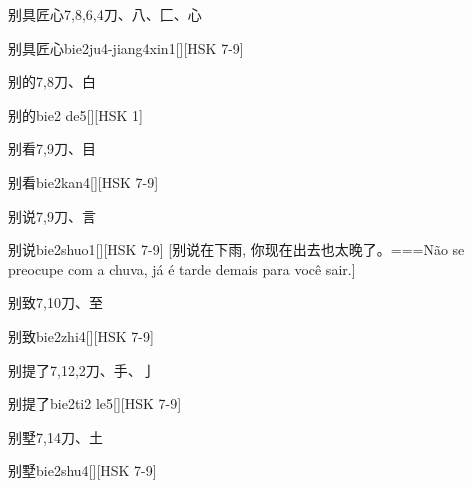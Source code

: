 \begin{Entry}{别具匠心}{7,8,6,4}{⼑、⼋、⼕、⼼}
  \begin{Phonetics}{别具匠心}{bie2ju4-jiang4xin1}[][HSK 7-9]
  \end{Phonetics}
\end{Entry}

\begin{Entry}{别的}{7,8}{⼑、⽩}
  \begin{Phonetics}{别的}{bie2 de5}[][HSK 1]
  \end{Phonetics}
\end{Entry}

\begin{Entry}{别看}{7,9}{⼑、⽬}
  \begin{Phonetics}{别看}{bie2kan4}[][HSK 7-9]
  \end{Phonetics}
\end{Entry}

\begin{Entry}{别说}{7,9}{⼑、⾔}
  \begin{Phonetics}{别说}{bie2shuo1}[][HSK 7-9]
    [别说在下雨, 你现在出去也太晚了。===Não se preocupe com a chuva, já é tarde demais para você sair.]
  \end{Phonetics}
\end{Entry}

\begin{Entry}{别致}{7,10}{⼑、⾄}
  \begin{Phonetics}{别致}{bie2zhi4}[][HSK 7-9]
  \end{Phonetics}
\end{Entry}

\begin{Entry}{别提了}{7,12,2}{⼑、⼿、⼅}
  \begin{Phonetics}{别提了}{bie2ti2 le5}[][HSK 7-9]
  \end{Phonetics}
\end{Entry}

\begin{Entry}{别墅}{7,14}{⼑、⼟}
  \begin{Phonetics}{别墅}{bie2shu4}[][HSK 7-9]
  \end{Phonetics}
\end{Entry}

